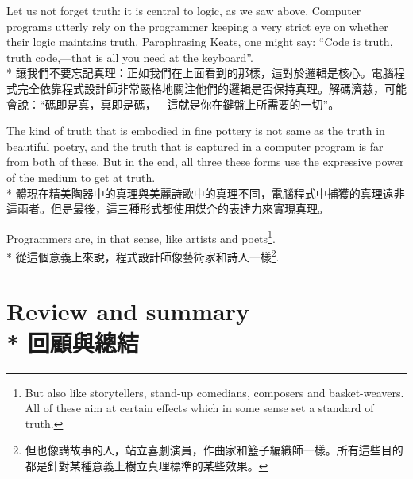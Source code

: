 \documentclass[]{article}
\begin{document}
{\color{gray}Let us not forget truth: it is central to logic, as we saw above. Computer programs utterly rely on the programmer keeping a very strict eye on whether their logic maintains truth. Paraphrasing Keats, one might say: ``Code is truth, truth code,---that is all you need at the keyboard''.}
\\*
{讓我們不要忘記真理：正如我們在上面看到的那樣，這對於邏輯是核心。電腦程式完全依靠程式設計師非常嚴格地關注他們的邏輯是否保持真理。解碼濟慈，可能會說：``碼即是真，真即是碼，---這就是你在鍵盤上所需要的一切''。}

{\color{gray}The kind of truth that is embodied in fine pottery is not same as the truth in beautiful poetry, and the truth that is captured in a computer program is far from both of these. But in the end, all three these forms use the expressive power of the medium to get at truth.}
\\*
{體現在精美陶器中的真理與美麗詩歌中的真理不同，電腦程式中捕獲的真理遠非這兩者。但是最後，這三種形式都使用媒介的表達力來實現真理。}

{\color{gray}Programmers are, in that sense, like artists and poets\footnote{But also like storytellers, stand-up comedians, composers and basket-weavers. All of these aim at certain effects which in some sense set a standard of truth. }.}
\\*
{從這個意義上來說，程式設計師像藝術家和詩人一樣\footnote{但也像講故事的人，站立喜劇演員，作曲家和籃子編織師一樣。所有這些目的都是針對某種意義上樹立真理標準的某些效果。}.}

\section*{{\color{gray}Review and summary}
\\*
{回顧與總結}}	
\end{document}
